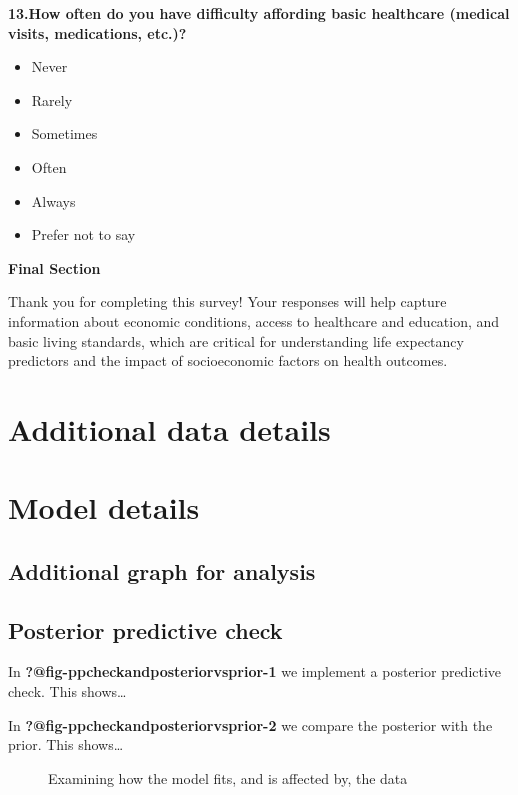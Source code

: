 \documentclass[
  letterpaper,
  DIV=11,
  numbers=noendperiod]{scrartcl}
\providecommand{\tightlist}{%
  \setlength{\itemsep}{0pt}\setlength{\parskip}{0pt}}\usepackage{longtable,booktabs,array}
\begin{document}
\textbf{13.How often do you have difficulty affording basic healthcare
(medical visits, medications, etc.)?}

\begin{itemize}
\tightlist
\item
  Never
\item
  Rarely
\item
  Sometimes
\item
  Often
\item
  Always
\item
  Prefer not to say
\end{itemize}

\textbf{Final Section}

Thank you for completing this survey! Your responses will help capture
information about economic conditions, access to healthcare and
education, and basic living standards, which are critical for
understanding life expectancy predictors and the impact of socioeconomic
factors on health outcomes.

\section{Additional data details}\label{additional-data-details}

\section{Model details}\label{sec-model-details}

\subsection{Additional graph for
analysis}\label{additional-graph-for-analysis}

\subsection{Posterior predictive
check}\label{posterior-predictive-check}

In \textbf{?@fig-ppcheckandposteriorvsprior-1} we implement a posterior
predictive check. This shows\ldots{}

In \textbf{?@fig-ppcheckandposteriorvsprior-2} we compare the posterior
with the prior. This shows\ldots{}

\begin{figure}

\begin{minipage}{0.50\linewidth}
Examining how the model fits, and is affected by, the
data\end{minipage}%

\end{figure}%
\end{document}
